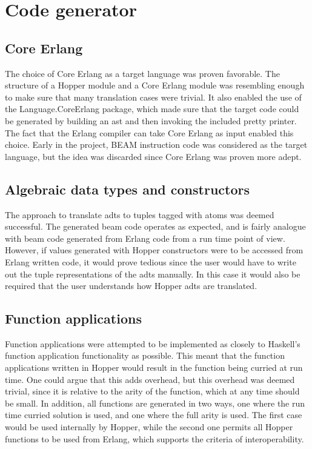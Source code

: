 \section{Code generator}

\subsection{Core Erlang}

The choice of Core Erlang as a target language was proven favorable. The structure of a Hopper module and a Core Erlang module was resembling enough to make sure that many translation cases were trivial. It also enabled the use of the Language.CoreErlang \cite{CoreErlang} package, which made sure that the target code could be generated by building an \gls{ast} and then invoking the included pretty printer. The fact that the Erlang compiler can take Core Erlang as input enabled this choice. Early in the project, BEAM instruction code was considered as the target language, but the idea was discarded since Core Erlang was proven more adept.

\subsection{Algebraic data types and constructors}

The approach to translate \glspl{adt} to tuples tagged with atoms was deemed successful. The generated beam code operates as expected, and is fairly analogue with beam code generated from Erlang code from a run time point of view. However, if values generated with Hopper constructors were to be accessed from Erlang written code, it would prove tedious since the user would have to write out the tuple representations of the \glspl{adt} manually. In this case it would also be required that the user understands how Hopper \glspl{adt} are translated.

\subsection{Function applications}

Function applications were attempted to be implemented as closely to Haskell's function application functionality as possible. This meant that the function applications written in Hopper would result in the function being curried at run time. One could argue that this adds overhead, but this overhead was deemed trivial, since it is relative to the arity of the function, which at any time should be small. In addition, all functions are generated in two ways, one where the run time curried solution is used, and one where the full arity is used. The first case would be used internally by Hopper, while the second one permits all Hopper functions to be used from Erlang, which supports  the criteria of interoperability.